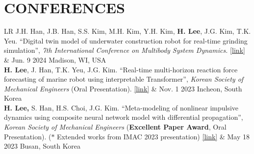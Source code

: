 \documentclass[a4paper,10pt]{extarticle}
\begin{document}

\section*{CONFERENCES}
\noindent
{}
\vspace*{-.5cm}
\begin{longtable}{LR}
	J.H. Han, J.B. Han, S.S. Kim, M.H. Kim, Y.H. Kim, \textbf{H. Lee}, J.G. Kim, T.K. Yeu. “Digital twin model of underwater construction robot for real-time grinding simulation”, \textit{7th International Conference on Multibody System Dynamics.} \href{https://easychair.org/publications/preprint/WkF3}{[link]}                                                                                              & {Jun. 9 2024 \linebreak Madison, WI, USA}     \\
	\textbf{H. Lee}, J. Han, T.K. Yeu, J.G. Kim. “Real-time multi-horizon reaction force forecasting of marine robot using interpretable Transformer”, \textit{Korean Society of Mechanical Engineers} (Oral Presentation). \href{https://www.dbpia.co.kr/Journal/articleDetail?nodeId=NODE11709087}{[link]}                                                                                                         & {Nov. 1 2023 \linebreak Incheon, South Korea} \\
	\textbf{H. Lee,} S. Han, H.S. Choi, J.G. Kim. “Meta-modeling of nonlinear impulsive dynamics using composite neural network model with differential propagation”, \textit{Korean Society of Mechanical Engineers} (\textbf{Excellent Paper Award}, Oral Presentation). {\small($*$ Extended works from IMAC 2023 presentation)} \href{https://www.dbpia.co.kr/journal/articleDetail?nodeId=NODE11511050}{[link]} & {May 18 2023 \linebreak Busan, South Korea}   \\

\end{longtable}
\end{document}
